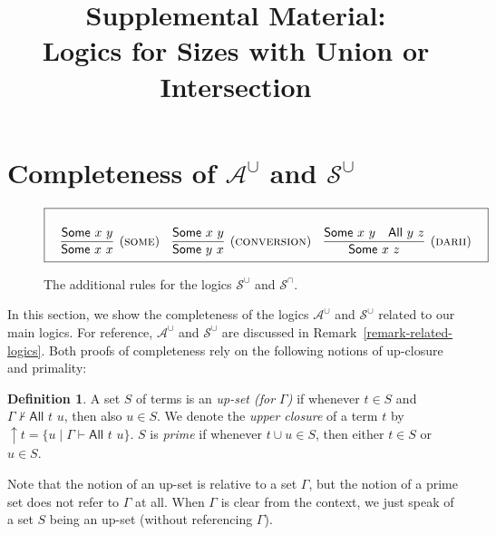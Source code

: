 \documentclass[letterpaper]{article} %
\title{Supplemental Material:\\Logics for Sizes with Union or Intersection}
\theoremstyle{definition}
\newtheorem{definition}[theorem]{Definition}
\newcommand{\set}[1]{\{ #1 \}}
\newcommand{\proves}{\vdash}
\newcommand{\Aunion}{\mathscr{A}^{\cup}}
\newcommand{\Sunion}{\mathscr{S}^{\cup}}
\newcommand{\Sinter}{\mathscr{S}^{\cap}}
\newcommand{\proverule}{\textsc}
\newcommand{\some}{\proverule{some}}
\newcommand{\conversion}{\proverule{conversion}}
\newcommand{\darii}{\proverule{darii}}
\newcommand{\All}[2]{\mathsf{All}\,\,#1\,\,#2}
\newcommand{\Some}[2]{\mathsf{Some}\,\,#1\,\,#2}
\begin{document}
\maketitle

\section{Completeness of $\Aunion$ and $\Sunion$}
\label{s:supp:completeness_Aunion_Sunion}

\begin{figure*}[t]
\begin{equation*}
\boxed{
\begin{array}{c}
\begin{array}{ccc}
\\ 
\infer[(\some)]
    {\Some{x}{x}}
    {\Some{x}{y}} 
&
\infer[(\conversion)]
    {\Some{y}{x}}
    {\Some{x}{y}}
&
\infer[(\darii)]
    {\Some{x}{z}}
    {\Some{x}{y} & \All{y}{z}}
\end{array}
\\
\end{array}
}
\end{equation*}
\caption{The additional rules for the logics $\Sunion$ and $\Sinter$.
\label{fig-rules-some}}
\end{figure*}

In this section, we show the completeness of the logics $\Aunion$ and $\Sunion$ related to our main logics.  For reference, $\Aunion$ and $\Sunion$ are discussed in Remark~\ref{remark-related-logics}.  Both proofs of completeness rely on the following notions of up-closure and primality:

\begin{definition} 
A set $S$ of terms is an \emph{up-set (for $\Gamma$)} if whenever $t\in S$ and $\Gamma \nvdash \All{t}{u}$, then also $u\in S$.  We denote the \emph{upper closure} of a term $t$ by $\uparrow t = \set{u \mid \Gamma \proves \All{t}{u}}$.
$S$ is \emph{prime} if whenever $t\cup u \in S$, then either $t\in S$ or $u\in S$.
\end{definition}

Note that the notion of an up-set is relative to a set $\Gamma$, but the notion of a prime set does not refer to $\Gamma$ at all.
When $\Gamma$ is clear from the context, we just speak of a set $S$ being an up-set (without referencing $\Gamma$).
\end{document}
